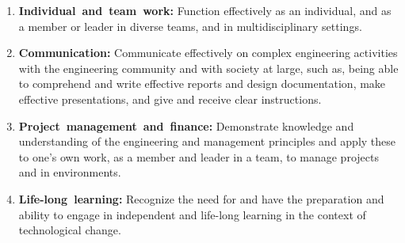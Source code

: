 \begin{missionpage}[\MissionOutcomesArtwork]
{\begin{enumerate}[label=\textbf{\arabic*},leftmargin=22.916bp,
      labelwidth=14bp,labelsep=8.916bp,align=left,
      topsep=0pt,partopsep=0pt,parsep=0pt,itemsep=9bp]
        responsibilities and norms of the engineering practice.
      \item \mbox{\textbf{Individual and team work:}} Function effectively as an individual, and as
        a member or leader in diverse teams, and in multidisciplinary settings.
      \item \mbox{\textbf{Communication:}} Communicate effectively on complex engineering activities
        with the engineering community and with society at large, such as, being able to
        comprehend and write effective reports and design documentation, make effective
        presentations, and give and receive clear instructions.
      \item \mbox{\textbf{Project management and finance:}} Demonstrate knowledge and understanding
        of the engineering and management principles and apply these to one’s own work,
        as a member and leader in a team, to manage projects and in environments.
      \item \mbox{\textbf{Life-long learning:}} Recognize the need for and have the preparation and
        ability to engage in independent and life-long learning in the context of
        technological change.
    \end{enumerate}
  }
  \label{front:outcomes-end}
\end{missionpage}
